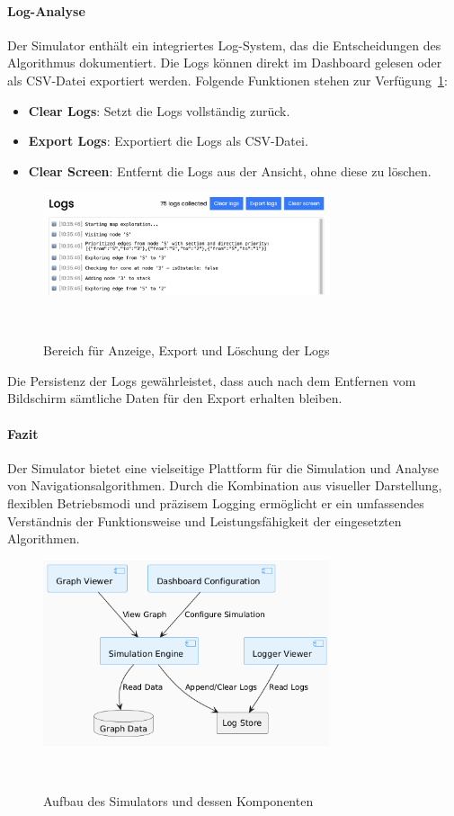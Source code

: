 \documentclass[main.tex]{subfiles} %
\begin{document}
\paragraph{Log-Analyse}

Der Simulator enthält ein integriertes Log-System, das die Entscheidungen des Algorithmus dokumentiert. Die Logs können direkt im Dashboard gelesen oder als CSV-Datei exportiert werden. Folgende Funktionen stehen zur Verfügung~\ref{fig:DashboardLogs}:

\begin{itemize}
    \item \textbf{Clear Logs}:  
    Setzt die Logs vollständig zurück.

    \item \textbf{Export Logs}:  
    Exportiert die Logs als CSV-Datei.

    \item \textbf{Clear Screen}:  
    Entfernt die Logs aus der Ansicht, ohne diese zu löschen.
\end{itemize}

\begin{figure}[H]
    \centering
    \includegraphics[width=0.75\textwidth]{./fig_Simulation/SimulatorLogs.png}
    \caption{Bereich für Anzeige, Export und Löschung der Logs}~\label{fig:DashboardLogs}
\end{figure}

Die Persistenz der Logs gewährleistet, dass auch nach dem Entfernen vom Bildschirm sämtliche Daten für den Export erhalten bleiben.

\paragraph{Fazit}

Der Simulator bietet eine vielseitige Plattform für die Simulation und Analyse von Navigationsalgorithmen. Durch die Kombination aus visueller Darstellung, flexiblen Betriebsmodi und präzisem Logging ermöglicht er ein umfassendes Verständnis der Funktionsweise und Leistungsfähigkeit der eingesetzten Algorithmen.

\begin{figure}[H]
    \centering
    \includegraphics[width=0.75\textwidth]{./fig_Simulation/SimulatorKomponentenDiagramm.png}
    \caption{Aufbau des Simulators und dessen Komponenten}~\label{fig:SimulatorKomponentenDiagramm}
\end{figure}
\end{document}
